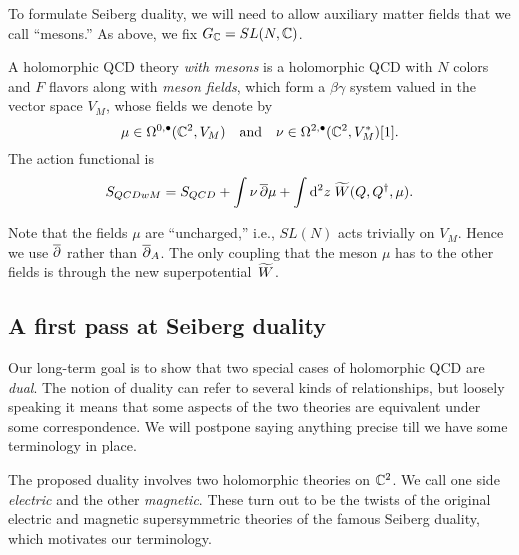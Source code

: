 \documentclass[11pt]{amsart}
\begin{document}
To formulate Seiberg duality, we will need to allow auxiliary matter fields that we call ``mesons.''
As above, we fix $G_{\mathbb C} = SL(N,\mathbb C)$.

\begin{dfn}
A holomorphic QCD theory {\em with mesons}
is a holomorphic QCD with $N$ colors and $F$ flavors along with {\em meson fields}, which form a $\beta\gamma$ system valued in the vector space $V_M$, whose fields we denote by
\[
\mu \in \Omega^{0,\bullet}(\mathbb C^2 , V_M) \quad\text{and}\quad \nu \in \Omega^{2,\bullet}(\mathbb C^2 , V_M^*) [1] .
\]
The action functional is
\[
S_{QCDwM} = S_{QCD} + \int \nu \,{\overline{\partial}} \mu + \int {\rm d}^2 z \; \widetilde W(Q, Q^\dag, \mu) .
\] 
\end{dfn}

Note that the fields $\mu$ are ``uncharged,'' i.e., $SL(N)$ acts trivially on $V_M$.
Hence we use ${\overline{\partial}}$ rather than ${\overline{\partial}}_A$.
The only coupling that the meson $\mu$ has to the other fields is through the new superpotential~$\widetilde W$. 

\subsection{A first pass at Seiberg duality}

Our long-term goal is to show that two special cases of holomorphic QCD are {\em dual}.
The notion of duality can refer to several kinds of relationships,
but loosely speaking it means that some aspects of the two theories are equivalent under some correspondence.
We will postpone saying anything precise till we have some terminology in place.


The proposed duality involves two holomorphic theories on $\mathbb C^2$. 
We call one side {\em electric} and the other {\em magnetic}.
These turn out to be the twists of the original electric and magnetic supersymmetric theories of the famous Seiberg duality, 
which motivates our terminology.
\end{document}
